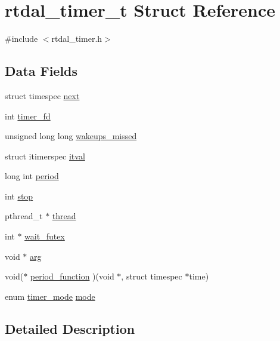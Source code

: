 \hypertarget{structrtdal__timer__t}{\section{rtdal\-\_\-timer\-\_\-t Struct Reference}
\label{structrtdal__timer__t}
}


{\ttfamily \#include $<$rtdal\-\_\-timer.\-h$>$}

\subsection*{Data Fields}
\begin{DoxyCompactItemize}
\item 
struct timespec \hyperlink{structrtdal__timer__t_a1224d0ece56f943b6afe4d7a5d8124a7}{next}
\item 
int \hyperlink{structrtdal__timer__t_aa7bf664cf9401e16c226f326e0672dfd}{timer\-\_\-fd}
\item 
unsigned long long \hyperlink{structrtdal__timer__t_ad605ac13eeb5dd9ba9715685e965e019}{wakeups\-\_\-missed}
\item 
struct itimerspec \hyperlink{structrtdal__timer__t_ae5b29f6b10dd563261807b39bc1431c0}{itval}
\item 
long int \hyperlink{structrtdal__timer__t_a289e83fa067430617d384467265df41e}{period}
\item 
int \hyperlink{structrtdal__timer__t_a760c332c00e1eebe04e98f6b238932b5}{stop}
\item 
pthread\-\_\-t $\ast$ \hyperlink{structrtdal__timer__t_a935b3c9da18c2f0a39588f4bba9e13d6}{thread}
\item 
int $\ast$ \hyperlink{structrtdal__timer__t_a5f908aa671f7e3adffbc9096c1dc415a}{wait\-\_\-futex}
\item 
void $\ast$ \hyperlink{structrtdal__timer__t_ac956640df81f13d496555dc5de7b1c80}{arg}
\item 
void($\ast$ \hyperlink{structrtdal__timer__t_a9e202cbf4ae2d7a24c3e956d9dd0cc48}{period\-\_\-function} )(void $\ast$, struct timespec $\ast$time)
\item 
enum \hyperlink{rtdal__timer_8h_a28110292f2481f7b44d1517fb4ce3c15}{timer\-\_\-mode} \hyperlink{structrtdal__timer__t_a5c6e934cbc400f85f5022346a532d01b}{mode}
\end{DoxyCompactItemize}


\subsection{Detailed Description}


